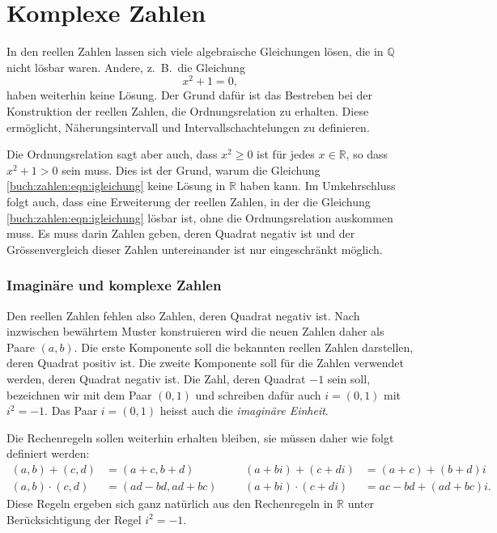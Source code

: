 %
%
%
\section{Komplexe Zahlen
\label{buch:section:komplexe-zahlen}}
In den reellen Zahlen lassen sich viele algebraische Gleichungen lösen,
die in $\mathbb{Q}$ nicht lösbar waren.
Andere, z.~B.~die Gleichung
\begin{equation}
x^2+1=0,
\label{buch:zahlen:eqn:igleichung}
\end{equation}
haben weiterhin keine Lösung.
Der Grund dafür ist das Bestreben bei der Konstruktion der reellen Zahlen, 
die Ordnungsrelation zu erhalten.
%
Diese ermöglicht, Näherungsintervall und Intervallschachtelungen
zu definieren.

Die Ordnungsrelation sagt aber auch, dass $x^2\ge 0$ ist für jedes
$x\in\mathbb{R}$, so dass $x^2+1>0$ sein muss.
Dies ist der Grund, warum die Gleichung \ref{buch:zahlen:eqn:igleichung}
keine Lösung in $\mathbb{R}$ haben kann.
Im Umkehrschluss folgt auch, dass eine Erweiterung der reellen Zahlen,
in der die Gleichung \eqref{buch:zahlen:eqn:igleichung} lösbar ist,
ohne die Ordnungsrelation auskommen muss.
Es muss darin Zahlen geben, deren Quadrat negativ ist und der
Grössenvergleich dieser Zahlen untereinander ist nur eingeschränkt
möglich.

\subsubsection{Imaginäre und komplexe Zahlen}
Den reellen Zahlen fehlen also Zahlen, deren Quadrat negativ ist.
Nach inzwischen bewährtem Muster konstruieren wird die neuen Zahlen
daher als Paare $(a,b)$.
Die erste Komponente soll die bekannten reellen Zahlen darstellen,
deren Quadrat positiv ist.
Die zweite Komponente soll für die Zahlen verwendet werden, deren Quadrat
negativ ist.
Die Zahl, deren Quadrat $-1$ sein soll, bezeichnen wir mit dem
Paar $(0,1)$ und schreiben dafür auch $i=(0,1)$ mit $i^2=-1$.
Das Paar $i=(0,1)$ heisst auch die {\em imaginäre Einheit}.
%

Die Rechenregeln sollen weiterhin erhalten bleiben, sie müssen daher
wie folgt definiert werden:
\begin{equation}
\begin{aligned}
(a,b) + (c,d) &= (a+c,b+d) &&& (a+bi) + (c+di) &= (a+c) + (b+d)i
\\
(a,b) \cdot (c,d) &= (ad-bd, ad+bc) &&& (a+bi)\cdot(c+di) &= ac-bd + (ad+bc)i.
\end{aligned}
\label{buch:zahlen:cregeln}
\end{equation}
Diese Regeln ergeben sich ganz natürlich aus den Rechenregeln
in $\mathbb{R}$ unter Berücksichtigung der Regel $i^2=-1$.

